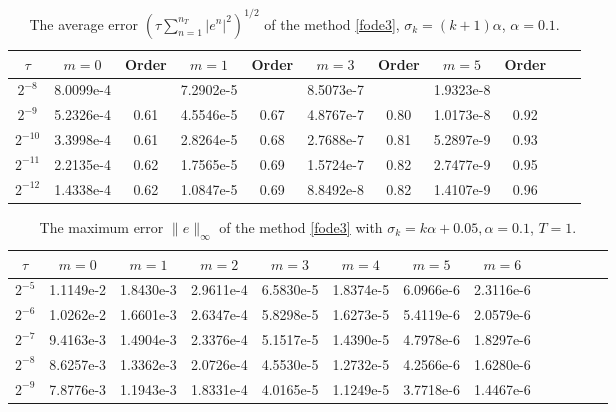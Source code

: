 \documentclass[10pt]{siamltex}
\begin{document}
\begin{table}[!h]
\caption{{The average  error   $\left(\tau\sum_{n=1}^{n_T}|e^n|^2\right)^{1/2}$
of the method \eqref{fode3}, $\sigma_k=(k+1)\alpha$,  $\alpha=0.1$.}}\label{tb6-3-3}
\centering\footnotesize
\begin{tabular}{|c|c|c|c|c|c|c|c|c|c|c|}
\hline
 $\tau$ & $m=0$ & Order& $m=1$ & Order& $m=3$ & Order & $m=5$ & Order\\
 \hline
$2^{-8}$ &8.0099e-4&    &7.2902e-5&    &8.5073e-7&    &1.9323e-8&     \\
$2^{-9}$ &5.2326e-4&0.61&4.5546e-5&0.67&4.8767e-7&0.80&1.0173e-8&0.92 \\
$2^{-10}$&3.3998e-4&0.61&2.8264e-5&0.68&2.7688e-7&0.81&5.2897e-9&0.93 \\
$2^{-11}$&2.2135e-4&0.62&1.7565e-5&0.69&1.5724e-7&0.82&2.7477e-9&0.95 \\
$2^{-12}$&1.4338e-4&0.62&1.0847e-5&0.69&8.8492e-8&0.82&1.4107e-9&0.96 \\
\hline
\end{tabular}
\end{table}





\begin{table}[!h]
\caption{{The maximum error $\|e\|_{\infty}$ of the method \eqref{fode3}
 with   $\sigma_k=k\alpha+0.05,\alpha=0.1$, ${T=1}$.}}\label{tb6-5-1}
\centering\footnotesize
\begin{tabular}{|c|c|c|c|c|c|c|c|c|c|c|c|c|}
\hline
 $\tau$ & $m=0$ & $m=1$ & $m=2$ &$m=3$ & $m=4$ &$m=5$  & $m=6$   \\
 \hline
$2^{-5}$&1.1149e-2&1.8430e-3&2.9611e-4&6.5830e-5&1.8374e-5&6.0966e-6&2.3116e-6 \\
$2^{-6}$&1.0262e-2&1.6601e-3&2.6347e-4&5.8298e-5&1.6273e-5&5.4119e-6&2.0579e-6 \\
$2^{-7}$&9.4163e-3&1.4904e-3&2.3376e-4&5.1517e-5&1.4390e-5&4.7978e-6&1.8297e-6 \\
$2^{-8}$&8.6257e-3&1.3362e-3&2.0726e-4&4.5530e-5&1.2732e-5&4.2566e-6&1.6280e-6 \\
$2^{-9}$&7.8776e-3&1.1943e-3&1.8331e-4&4.0165e-5&1.1249e-5&3.7718e-6&1.4467e-6 \\
\hline
\end{tabular}
\end{table}
\end{document}
